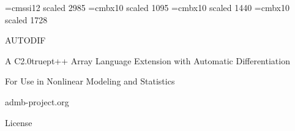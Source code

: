 %
%
\font\halfinch=cmssi12 scaled 2985
\font\smallheadfont=cmbx10 scaled 1095
\font\largeheadfont=cmbx10 scaled 1440
\font\hugeheadfont=cmbx10 scaled 1728

\vspace*{2in}
{\hugeheadfont
\centerline{\halfinch AUTODIF}}
\vspace{0.5in}
{\largeheadfont
\centerline{A C\raise2.0truept\hbox{\smallheadfont ++} Array Language Extension with Automatic Differentiation}
\bigskip
\centerline{For Use in Nonlinear Modeling and Statistics}
\vspace{0.5in}
\centerline{admb-project.org}}

\vfill
\eject

\centerline{\LARGE License}


\twelverm
\vfil
\supereject


